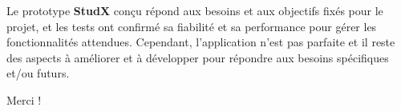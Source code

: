\documentclass{beamer}
\begin{document}
\begin{frame}
  Le prototype \textbf{StudX} conçu répond aux besoins et aux objectifs fixés pour le projet, et les tests ont 
  confirmé sa fiabilité et sa performance pour gérer les fonctionnalités 
  attendues. Cependant, l'application n'est pas parfaite et il reste des aspects à améliorer et à développer pour répondre aux besoins
  spécifiques et/ou futurs.
\end{frame}

\begin{frame}
  \begin{center}
  \LARGE{Merci !}
  \end{center}

\end{frame}
\end{document}
